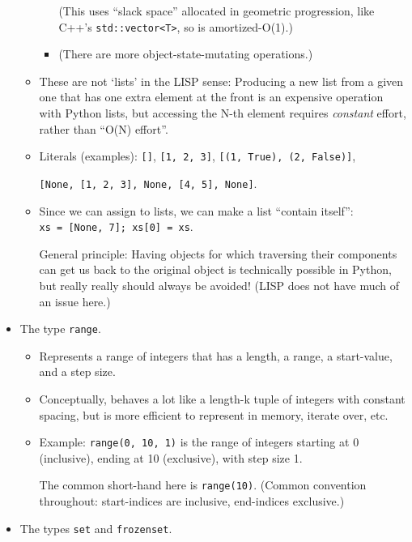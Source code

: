 \documentclass[11pt]{article}
\begin{document}
\begin{itemize}
\begin{itemize}
\begin{itemize}
      (This uses ``slack space'' allocated in geometric progression,
      like C++'s \texttt{std::vector\textless{}T\textgreater{}}, so is
      amortized-O(1).)
    \item
      (There are more object-state-mutating operations.)
    \end{itemize}
  \item
    These are not `lists' in the LISP sense: Producing a new list from a
    given one that has one extra element at the front is an expensive
    operation with Python lists, but accessing the N-th element requires
    \emph{constant} effort, rather than ``O(N) effort''.
  \item
    Literals (examples): \texttt{{[}{]}}, \texttt{{[}1,\ 2,\ 3{]}},
    \texttt{{[}(1,\ True),\ (2,\ False){]}},

    \texttt{{[}None,\ {[}1,\ 2,\ 3{]},\ None,\ {[}4,\ 5{]},\ None{]}}.
  \item
    Since we can assign to lists, we can make a list ``contain itself'':
    \texttt{xs\ =\ {[}None,\ 7{]};\ xs{[}0{]}\ =\ xs}.

    General principle: Having objects for which traversing their
    components can get us back to the original object is technically
    possible in Python, but really really should always be avoided!
    (LISP does not have much of an issue here.)
  \end{itemize}
\item
  The type \texttt{range}.

  \begin{itemize}
  \item
    Represents a range of integers that has a length, a range, a
    start-value, and a step size.
  \item
    Conceptually, behaves a lot like a length-k tuple of integers with
    constant spacing, but is more efficient to represent in memory,
    iterate over, etc.
  \item
    Example: \texttt{range(0,\ 10,\ 1)} is the range of integers
    starting at 0 (inclusive), ending at 10 (exclusive), with step size
    1.

    The common short-hand here is \texttt{range(10)}. (Common convention
    throughout: start-indices are inclusive, end-indices exclusive.)
  \end{itemize}
\item
  The types \texttt{set} and \texttt{frozenset}.


\end{itemize}
\end{document}

